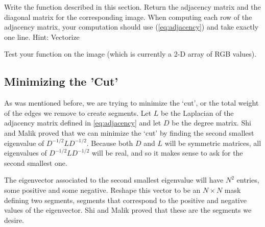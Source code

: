\begin{problem}
Write the function  described in this section.  Return the adjacency matrix and the diagonal matrix for the corresponding image.
When computing each row of the adjacency matrix, your computation should use (\ref{eq:adjacency}) and take exactly one line.  Hint: Vectorize

Test your function on the image  (which is currently a 2-D array of RGB values).


\label{prob:adjacency_dream}
\end{problem}

\subsection*{Minimizing the 'Cut'}

As was mentioned before, we are trying to minimize the `cut', or the total weight of the edges we remove to create segments. 
Let $L$ be the Laplacian of the adjacency matrix defined in \ref{eq:adjacency} and let $D$ be the degree matrix.
Shi and Malik proved that we can minimize the `cut' by finding the second smallest eigenvalue of $D^{-1/2}LD^{-1/2}$.
Because both $D$ and $L$ will be symmetric matrices, all eigenvalues of $D^{-1/2}LD^{-1/2}$ will be real, and so it makes sense to ask for the second smallest one.

The eigenvector associated to the second smallest eigenvalue will have $N^2$ entries, some positive and some negative. 
Reshape this vector to be an $N \times N$ mask defining two segments, segments that correspond to the positive and negative values of the eigenvector.
Shi and Malik proved that these are the segments we desire. 


